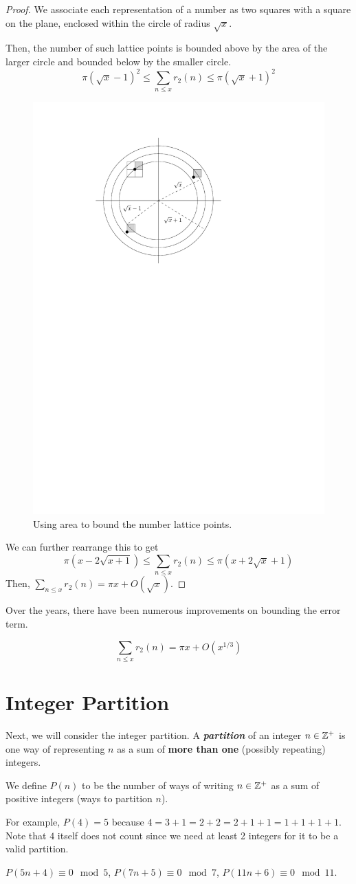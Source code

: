 \begin{proof}
    We associate each representation of a number as two squares with a square on the plane, enclosed within the circle of radius $\sqrt{x}$.

    Then, the number of such lattice points is bounded above by the area of the larger circle and bounded below by the smaller circle.
    $$
    \pi(\sqrt{x} - 1)^2 \leq \sum_{n \leq x}r_2(n) \leq \pi(\sqrt{x} + 1)^2
    $$
    \begin{figure}[htbp]
        \centering
        \includegraphics[width=.4\linewidth]{figures/gauss-circle-area.pdf}
        \caption{Using area to bound the number lattice points.}
        \label{fig:gauss-circle-area}
    \end{figure} 
    We can further rearrange this to get
    $$
    \pi(x - 2\sqrt{x+1}) \leq \sum_{n \leq x} r_2(n) \leq \pi(x + 2\sqrt{x} + 1)
    $$
    Then, $\sum_{n\leq x}r_2(n) = \pi x + O(\sqrt{x})$. 
\end{proof}

Over the years, there have been numerous improvements on bounding the error term.

\begin{theorem}[Sierpinski 1906]
    $$
    \sum_{n \leq x} r_2(n) = \pi x + O(x^{1/3})
    $$
\end{theorem}

\section{Integer Partition}

Next, we will consider the integer partition. A \textit{\textbf{partition}} of an integer $n \in \mathbb{Z}^+$ is one way of representing $n$ as a sum of \textbf{more than one} (possibly repeating) integers.

We define $P(n)$ to be the number of ways of writing $n \in \mathbb{Z}^+$ as a sum of positive integers (ways to partition $n$).

For example, $P(4) = 5$ because $4 = 3+1 = 2+2 = 2+1+1 = 1+1+1+1$. Note that $4$ itself does not count since we need at least 2 integers for it to be a valid partition.

\begin{conjecture}
    $P(5n + 4) \equiv 0 \mod 5$, $P(7n + 5) \equiv 0 \mod 7$, $P(11n + 6) \equiv 0 \mod 11$.
\end{conjecture}